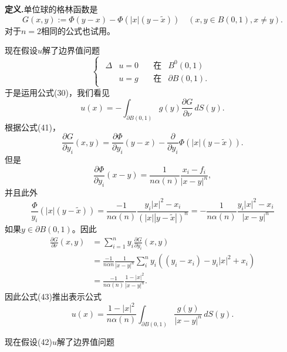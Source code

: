 \documentclass[leqno]{article}
\numberwithin{equation}{subsection}%
\begin{document}
\noindent\textbf{定义.}单位球的格林函数是
\begin{equation}
G(x,y):=\Phi(y-x)-\Phi(|x|(y-\tilde{x}))\quad(x,y\in B(0,1),x\neq y).
\end{equation}
对于$n=2$相同的公式也试用。
\par
现在假设$u$解了边界值问题
\begin{equation}
\begin{cases}
\begin{aligned}
\Delta &u=0 \quad &\text{在}&B^{0}(0,1)\\
&u=g&\text{在}&\partial B(0,1).
\end{aligned}
\end{cases}
\end{equation}
于是运用公式(30)，我们看见
\begin{equation}
u(x)=-\int_{\partial B(0,1)}g(y)\frac{\partial G}{\partial\nu}\,dS(y).
\end{equation}
根据公式(41)，
\begin{equation*}
\frac{\partial G}{\partial y_{i}}(x,y)=\frac{\partial \Phi}{\partial y_{i}}(y-x)-\frac{\partial}{\partial y_{i}}\Phi(|x|(y-\tilde{x})).
\end{equation*}
但是
\begin{equation*}
\frac{\partial\Phi}{\partial y_{i}}(x-y)=\frac{1}{n\alpha(n)}\frac{x_{i}-f_{i}}{|x-y|^{n}},
\end{equation*}
并且此外
\begin{equation*}
\frac{\Phi}{y_{i}}(|x|(y-\tilde{x}))=\frac{-1}{n\alpha(n)}\frac{y_{i}|x|^{2}-x_{i}}{(|x||y-\tilde{x}|)^{n}}=-\frac{1}{n\alpha(n)}\frac{y_{i}|x|^{2}-x_{i}}{|x-y|^{n}}
\end{equation*}
如果$y\in\partial B(0,1)$。因此
\begin{equation*}
\begin{aligned}
\frac{\partial G}{\partial\nu}(x,y)&=\sum_{i=1}^{n}y_{i}\frac{\partial G}{\partial y_{i}}(x,y)\\
&=\frac{-1}{n\alpha{n}}\frac{1}{|x-y|^{n}}\sum_{i}^{n}y_{i}((y_{i}-x_{i})-y_{i}|x|^{2}+x_{i})\\
&=\frac{-1}{n\alpha(n)}\frac{1-|x|^{2}}{|x-y|^{n}}.
\end{aligned}
\end{equation*}
因此公式(43)推出表示公式
\begin{equation*}
u(x)=\frac{1-|x|^{2}}{n\alpha(n)}\int_{\partial B(0,1)}\frac{g(y)}{|x-y|^{n}}\,dS(y).
\end{equation*}
\par
现在假设(42)$u$解了边界值问题
\end{document}

